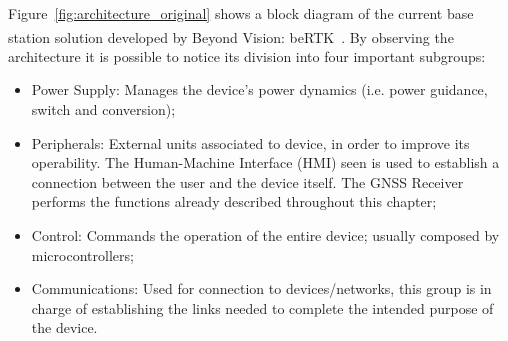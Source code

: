 Figure~\ref{fig:architecture_original} shows a block diagram of the current base station solution developed by Beyond Vision: beRTK\textsuperscript{\textregistered}~\cite{beRTK_2022}.
By observing the architecture it is possible to notice its division into four important subgroups:
\begin{itemize}
    \item Power Supply: Manages the device's power dynamics (i.e. power guidance, switch and conversion);
    \item Peripherals: External units associated to device, in order to improve its operability. The Human-Machine Interface (HMI) seen is used to establish a connection between the user and the device itself. The GNSS Receiver performs the functions already described throughout this chapter;
    \item Control: Commands the operation of the entire device; usually composed by microcontrollers;
    \item Communications: Used for connection to devices/networks, this group is in charge of establishing the links needed to complete the intended purpose of the device.
\end{itemize}


